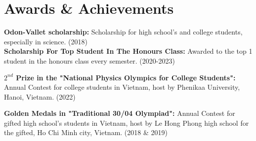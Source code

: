 \documentclass[letterpaper,11pt]{article}
\newcommand{\resumeSubHeadingListStart}{\begin{itemize}[leftmargin=0.15in, label={}]}
\newcommand{\resumeSubHeadingListEnd}{\end{itemize}}
\begin{document}
	\section{Awards \& Achievements}
	\vspace{2pt}
	\resumeSubHeadingListStart
	\small{\item{
			\textbf{Odon-Vallet scholarship:}{ Scholarship for high school's and college students, especially in science. (2018)} \\ \vspace{3pt}
			\textbf{Scholarship For Top Student In The Honours Class:}{ Awarded to the top 1 student in the honours class every semester. (2020-2023)} \\ \vspace{3pt}
			
			\textbf{\(2^{\textit{nd}}\) Prize in the "National Physics Olympics for College Students":}{ Annual Contest for college students in Vietnam, host by Phenikaa University, Hanoi, Vietnam. (2022)} \\ \vspace{3pt}
			
			
			\textbf{Golden Medals in "Traditional 30/04 Olympiad":}{ Annual Contest for gifted high school's students in Vietnam, host by Le Hong Phong high school for the gifted, Ho Chi Minh city, Vietnam. (2018 \& 2019)} \\ \vspace{3pt}
			
	}}
	\resumeSubHeadingListEnd
	
	
	
	
\end{document}
